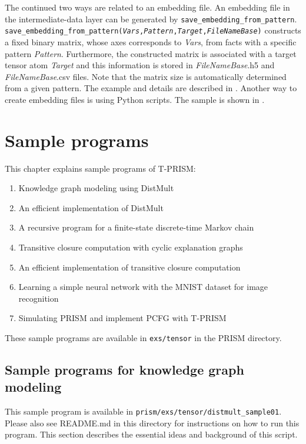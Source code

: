 \documentclass[a4paper]{report}
\begin{document}
The continued two ways are related to an embedding file.
An embedding file in the intermediate-data layer can be generated by {\tt save\_embedding\_from\_pattern}.
{\tt save\_embedding\_from\_pattern({\it Vars},{\it Pattern},{\it Target},{\it FileNameBase})}
constructs a fixed binary matrix, whose axes corresponds to {\it Vars}, from facts with a specific pattern {\it Pattern}. Furthermore, the constructed matrix is associated with a target tensor atom {\it Target} and this information is stored in {\it FileNameBase}.h5 and {\it FileNameBase}.csv files.
Note that the matrix size is automatically determined from a given pattern.
The example and details are described in .
Another way to create embedding files is using Python scripts.
The sample is shown in .



\chapter{Sample programs}
\label{chap:tprism_sample}

This chapter explains sample programs of T-PRISM:
\begin{enumerate}
\item Knowledge graph modeling using DistMult  \cite{Yang15}
\item An efficient implementation of DistMult
\item A recursive program for a  finite-state discrete-time  Markov chain
\item Transitive closure computation with cyclic explanation graphs
\item An efficient implementation of transitive closure computation
\item Learning a simple neural network with the MNIST dataset \cite{lecun1998mnist} for image recognition
\item Simulating PRISM and implement PCFG with T-PRISM
\end{enumerate}
These sample programs are available in \verb|exs/tensor| in the PRISM directory.

\section{Sample programs for knowledge graph modeling}
\label{sec:distmult01}

This sample program is available in \verb|prism/exs/tensor/distmult_sample01|.
Please also see README.md in this directory  for instructions on how to run this program.
This section describes the essential ideas and background of this script. 
\end{document}
